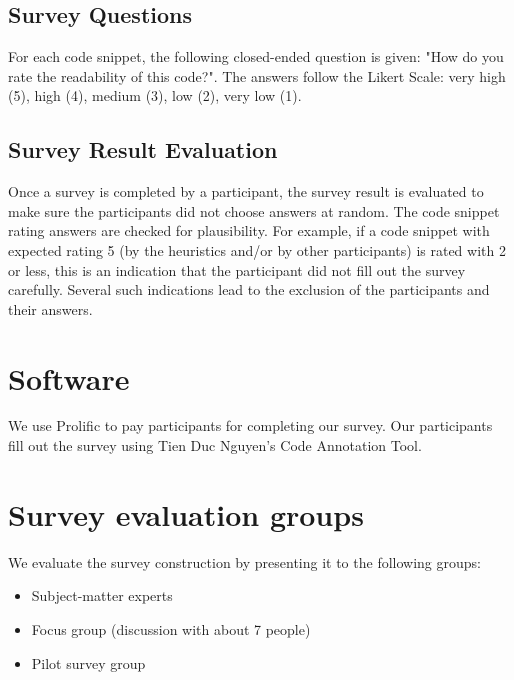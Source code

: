 \documentclass[%
class=scrreprt,
chapterprefix=false,%
open=right,%
twoside=false,%
paper=a4,%
logofile={Logo\_zentral\_farbig\_EN.png},%
thesistype=masterproposal,%
UKenglish,%
]{se2thesis}
\begin{document}
	



\subsection{Survey Questions} %
For each code snippet, the following closed-ended question is given: "How do you rate the readability of this code?". The answers follow the Likert Scale: very high (5), high (4), medium (3), low (2), very low (1).

\subsection{Survey Result Evaluation}
Once a survey is completed by a participant, the survey result is evaluated to make sure the participants did not choose answers at random. The code snippet rating answers are checked for plausibility. For example, if a code snippet with expected rating 5 (by the heuristics and/or by other participants) is rated with 2 or less, this is an indication that the participant did not fill out the survey carefully. Several such indications lead to the exclusion of the participants and their answers.

\section{Software}
We use Prolific to pay participants for completing our survey. Our participants fill out the survey using Tien Duc Nguyen's Code Annotation Tool.

\section{Survey evaluation groups} \label{sec:survey-evaluation}
We evaluate the survey construction by presenting it to the following groups:
\begin{itemize}
	\item Subject-matter experts
	\item Focus group (discussion with about 7 people)
	\item Pilot survey group
\end{itemize}
\end{document}
